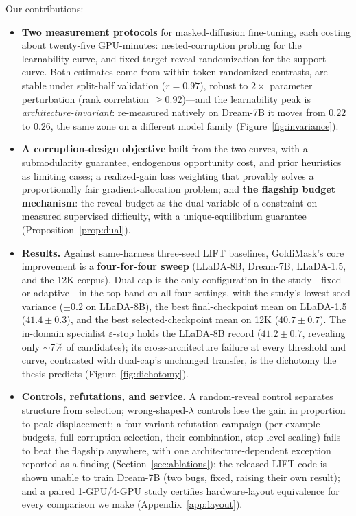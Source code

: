 \documentclass{article} %
\begin{document}
Our contributions:
\begin{itemize}
\item \textbf{Two measurement protocols} for masked-diffusion fine-tuning, each costing about twenty-five GPU-minutes: nested-corruption probing for the learnability curve, and fixed-target reveal randomization for the support curve. Both estimates come from within-token randomized contrasts, are stable under split-half validation ($r = 0.97$), robust to $2\times$ parameter perturbation (rank correlation $\geq 0.92$)---and the learnability peak is \emph{architecture-invariant}: re-measured natively on Dream-7B it moves from $0.22$ to $0.26$, the same zone on a different model family (Figure~\ref{fig:invariance}).
\item \textbf{A corruption-design objective} built from the two curves, with a submodularity guarantee, endogenous opportunity cost, and prior heuristics as limiting cases; a realized-gain loss weighting that provably solves a proportionally fair gradient-allocation problem; and \textbf{the flagship budget mechanism}: the reveal budget as the dual variable of a constraint on measured supervised difficulty, with a unique-equilibrium guarantee (Proposition~\ref{prop:dual}).
\item \textbf{Results.} Against same-harness three-seed LIFT baselines, GoldiMask's core improvement is a \textbf{four-for-four sweep} (LLaDA-8B, Dream-7B, LLaDA-1.5, and the 12K corpus). Dual-cap is the only configuration in the study---fixed or adaptive---in the top band on all four settings, with the study's lowest seed variance ($\pm 0.2$ on LLaDA-8B), the best final-checkpoint mean on LLaDA-1.5 ($41.4 \pm 0.3$), and the best selected-checkpoint mean on 12K ($40.7 \pm 0.7$). The in-domain specialist $\varepsilon$-stop holds the LLaDA-8B record ($41.2 \pm 0.7$, revealing only $\sim$7\% of candidates); its cross-architecture failure at every threshold and curve, contrasted with dual-cap's unchanged transfer, is the dichotomy the thesis predicts (Figure~\ref{fig:dichotomy}).
\item \textbf{Controls, refutations, and service.} A random-reveal control separates structure from selection; wrong-shaped-$\lambda$ controls lose the gain in proportion to peak displacement; a four-variant refutation campaign (per-example budgets, full-corruption selection, their combination, step-level scaling) fails to beat the flagship anywhere, with one architecture-dependent exception reported as a finding (Section~\ref{sec:ablations}); the released LIFT code is shown unable to train Dream-7B (two bugs, fixed, raising their own result); and a paired 1-GPU/4-GPU study certifies hardware-layout equivalence for every comparison we make (Appendix~\ref{app:layout}).
\end{itemize}
\end{document}
